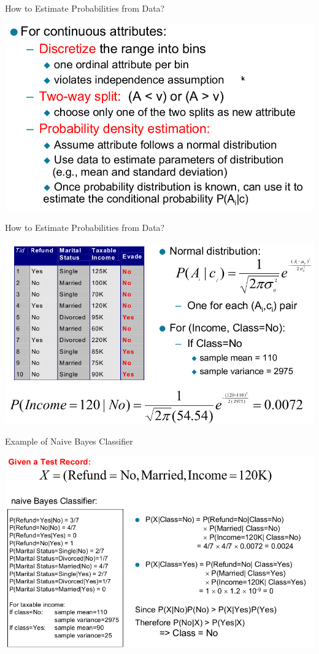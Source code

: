 \documentclass{beamer}
\begin{document}
\begin{frame}{How to Estimate Probabilities from Data?}
    \begin{center}
        \includegraphics[scale=0.4]{bayesClassifier7.png}
    \end{center}
\end{frame}
\begin{frame}{How to Estimate Probabilities from Data?}
    \begin{center}
        \includegraphics[scale=0.36]{bayesClassifier8.png}
    \end{center}
\end{frame}
\begin{frame}{Example of Naive Bayes Classifier}
    \begin{center}
        \includegraphics[scale=0.4]{bayesClassifier9.png}
    \end{center}
\end{frame}
\end{document}
